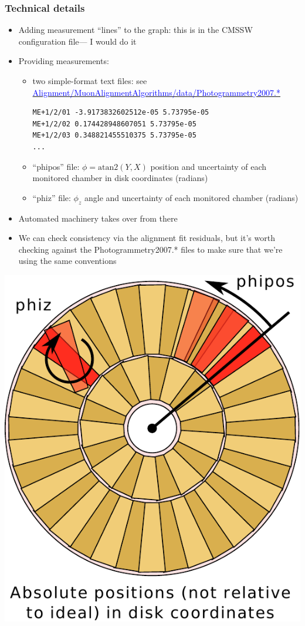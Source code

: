 \documentclass[compress]{beamer}
\begin{document}
\begin{frame}[fragile]
\frametitle{Technical details}
\begin{itemize}
\item Adding measurement ``lines'' to the graph: this is in the CMSSW configuration file--- I would do it

\item Providing measurements:
\begin{itemize}
\item two simple-format text files: see \mbox{\href{http://cmssw.cvs.cern.ch/cgi-bin/cmssw.cgi/CMSSW/Alignment/MuonAlignmentAlgorithms/data}{\textcolor{blue}{Alignment/MuonAlignmentAlgorithms/data/Photogrammetry2007.*}}\hspace{-2 cm}}
\begin{verbatim}
ME+1/2/01 -3.9173832602512e-05 5.73795e-05
ME+1/2/02 0.174428948607051 5.73795e-05
ME+1/2/03 0.348821455510375 5.73795e-05
...
\end{verbatim}
\item ``phipos'' file: $\phi = \mbox{atan2}(Y, X)$ position and uncertainty of each monitored chamber in disk coordinates (radians)
\item ``phiz'' file: $\phi_z$ angle and uncertainty of each monitored chamber (radians)
\end{itemize}
\item Automated machinery takes over from there
\item We can check consistency via the alignment fit residuals, but it's worth checking against the Photogrammetry2007.* files to make sure that we're using the same conventions
\end{itemize}
\end{frame}

\begin{frame}
\begin{center}
\includegraphics[width=0.5\linewidth]{diagram.pdf}
\end{center}
\label{numpages}
\end{frame}
\end{document}
